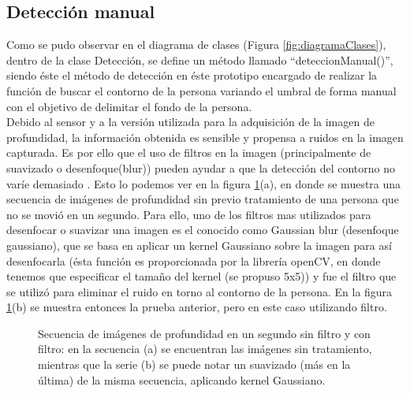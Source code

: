 \documentclass[a4paper,openright,12pt]{report}
\begin{document}
\subsection{Detección manual}
Como se pudo observar en el diagrama de clases (Figura \ref{fig:diagramaClases}), dentro de la clase Detección, se define un método llamado ``deteccionManual()'', siendo éste el método de detección en éste prototipo encargado de realizar la función de buscar el contorno de la persona variando el umbral de forma manual con el objetivo de delimitar el fondo de la persona.\\
Debido al sensor y a la versión utilizada para la adquisición de la imagen de profundidad, la información obtenida es sensible y propensa a ruidos en la imagen capturada. Es por ello que el uso de filtros en la imagen (principalmente de suavizado o desenfoque(blur)) pueden ayudar a que la detección del contorno no varíe demasiado \citep{Gonzalez2006}. Esto lo podemos ver en la figura \ref{fig:filtrado}(a), en donde se muestra una secuencia de imágenes de profundidad sin previo tratamiento de una persona que no se movió en un segundo. Para ello, uno de los filtros mas utilizados para desenfocar o suavizar una imagen es el conocido como Gaussian blur (desenfoque gaussiano), que se basa en aplicar un kernel Gaussiano sobre la imagen para así desenfocarla (ésta función es proporcionada por la librería openCV, en donde tenemos que especificar el tamaño del kernel (se propuso 5x5)) y fue el filtro que se utilizó para eliminar el ruido en torno al contorno de la persona. En la figura \ref{fig:filtrado}(b) se muestra entonces la prueba anterior, pero en este caso utilizando filtro.
\begin{figure}[ht]
	\centering
	\caption[Secuencia de imágenes de profundidad en un segundo sin filtro y con filtro]{Secuencia de imágenes de profundidad en un segundo sin filtro y con filtro: en la secuencia (a) se encuentran las imágenes sin tratamiento, mientras que la serie (b) se puede notar un suavizado (más en la última) de la misma secuencia, aplicando kernel Gaussiano.} \label{fig:filtrado}
\end{figure}\\
\end{document}
